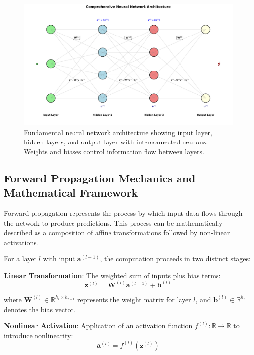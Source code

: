 \documentclass[11pt,a4paper]{report}
\begin{document}
\begin{figure}[H]
\centering
\includegraphics[width=1\textwidth]{neural_network_architecture.png}
\caption{Fundamental neural network architecture showing input layer, hidden layers, and output layer with interconnected neurons. Weights and biases control information flow between layers.}
\label{fig:nn_architecture}
\end{figure}

\subsection{Forward Propagation Mechanics and Mathematical Framework}

Forward propagation represents the process by which input data flows through the network to produce predictions. This process can be mathematically described as a composition of affine transformations followed by non-linear activations.

For a layer $l$ with input $\mathbf{a}^{(l-1)}$, the computation proceeds in two distinct stages:

\textbf{Linear Transformation}: The weighted sum of inputs plus bias terms:
\begin{equation}
\mathbf{z}^{(l)} = \mathbf{W}^{(l)} \mathbf{a}^{(l-1)} + \mathbf{b}^{(l)}
\end{equation}

where $\mathbf{W}^{(l)} \in \mathbb{R}^{h_l \times h_{l-1}}$ represents the weight matrix for layer $l$, and $\mathbf{b}^{(l)} \in \mathbb{R}^{h_l}$ denotes the bias vector.

\textbf{Nonlinear Activation}: Application of an activation function $f^{(l)}: \mathbb{R} \rightarrow \mathbb{R}$ to introduce nonlinearity:
\begin{equation}
\mathbf{a}^{(l)} = f^{(l)}(\mathbf{z}^{(l)})
\end{equation}
\end{document}
